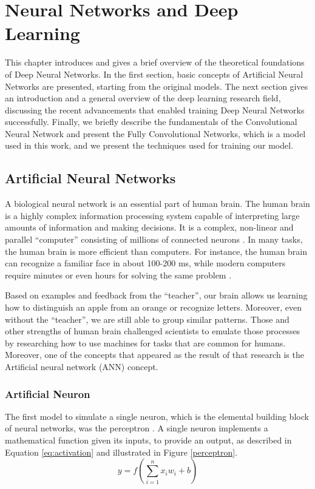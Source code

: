 
\chapter{Neural Networks and Deep Learning} \label{ch:nndl}
This chapter introduces and gives a brief overview of the theoretical foundations of Deep Neural Networks. In the first section, basic concepts of Artificial Neural Networks are presented, starting from the original models. The next section gives an introduction and a general overview of the deep learning research field, discussing the recent advancements that enabled training Deep Neural Networks successfully. Finally, we briefly describe the fundamentals of the Convolutional Neural Network and present the Fully Convolutional Networks, which is a model used in this work, and we present the techniques used for training our model.

\section{Artificial Neural Networks}

A biological neural network is an essential part of human brain. The human brain is a highly complex information processing system capable of interpreting large amounts of information and making decisions. It is a complex, non-linear and parallel ``computer'' consisting of millions of connected neurons \cite{haykin2009neural}. In many tasks, the human brain is more efficient than computers. For instance, the human brain can recognize a familiar face in about 100-200 ms, while modern computers require minutes or even hours for solving the same problem \cite{haykin2009neural}.

Based on examples and feedback from the ``teacher'', our brain allows us learning how to
distinguish an apple from an orange or recognize letters. Moreover, even without the ``teacher'', we are still able to group similar patterns. Those and other strengths of human brain challenged scientists to emulate those processes by researching how to use machines for tasks that are common for humans. Moreover, one of the concepts that appeared as the result of that research is the Artificial neural network (ANN) concept. 

\subsection{Artificial Neuron}
The first model to simulate a single neuron, which is the elemental building block of neural networks, was the perceptron \cite{rosenblatt1958perceptron}. A single neuron implements a mathematical function given its inputs, to provide an output, as described in Equation \ref{eq:activation} and illustrated in Figure \ref{perceptron}.
\begin{equation}
y = f(\sum_{i=1}^{n} x_{i}w_{i} + b)
\label{eq:activation}
\end{equation}

